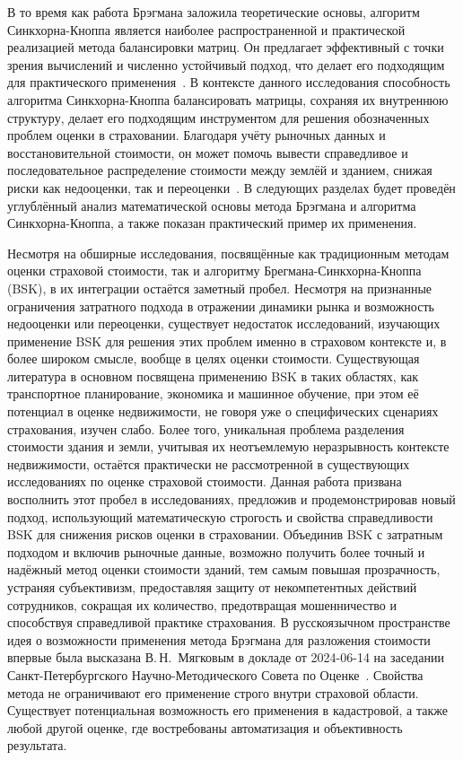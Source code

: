 \documentclass[12pt]{scrartcl}
\begin{document}
В то время как работа Брэгмана заложила теоретические основы, алгоритм Синкхорна-Кноппа является наиболее распространенной и практической реализацией метода балансировки матриц. Он предлагает эффективный с точки зрения вычислений и численно устойчивый подход, что делает его подходящим для практического применения~\cite{Djuric2012}. В контексте данного исследования способность алгоритма Синкхорна-Кноппа балансировать матрицы, сохраняя их внутреннюю структуру, делает его подходящим инструментом для решения обозначенных проблем оценки в страховании. Благодаря учёту рыночных данных и восстановительной стоимости, он может помочь вывести справедливое и последовательное распределение стоимости между землёй и зданием, снижая риски как недооценки, так и переоценки~\cite{Knight2008}. В следующих разделах будет проведён углублённый анализ математической основы метода Брэгмана и алгоритма Синкхорна-Кноппа, а также показан практический пример их применения.

Несмотря на обширные исследования, посвящённые как традиционным методам оценки страховой стоимости, так и алгоритму Брегмана-Синкхорна-Кноппа (BSK), в их интеграции остаётся заметный пробел. Несмотря на признанные ограничения затратного подхода в отражении динамики рынка и возможность недооценки или переоценки, существует недостаток исследований, изучающих применение BSK для решения этих проблем именно в страховом контексте и, в более широком смысле, вообще в целях оценки стоимости. Существующая литература в основном посвящена применению BSK в таких областях, как транспортное планирование, экономика и машинное обучение, при этом её потенциал в оценке недвижимости, не говоря уже о специфических сценариях страхования, изучен слабо. Более того, уникальная проблема разделения стоимости здания и земли, учитывая их неотъемлемую неразрывность контексте недвижимости, остаётся практически не рассмотренной в существующих исследованиях по оценке страховой стоимости. Данная работа призвана восполнить этот пробел в исследованиях, предложив и продемонстрировав новый подход, использующий математическую строгость и свойства справедливости BSK для снижения рисков оценки в страховании. Объединив BSK с затратным подходом и включив рыночные данные, возможно получить более точный и надёжный метод оценки стоимости зданий, тем самым повышая прозрачность, устраняя субъективизм, предоставляя защиту от некомпетентных действий сотрудников, сокращая их количество, предотвращая мошенничество и способствуя справедливой практике страхования. В русскоязычном пространстве идея о возможности применения метода Брэгмана для разложения стоимости впервые была высказана В.\,Н.~Мягковым в докладе от 2024-06-14 на заседании Санкт-Петербургского Научно-Методического Совета по Оценке~\cite{Myagkov202409051, Myagkov202409052}. Свойства метода не ограничивают его применение строго внутри страховой области. Существует потенциальная возможность его применения в кадастровой, а также любой другой оценке, где востребованы автоматизация и объективность результата.
\end{document}
